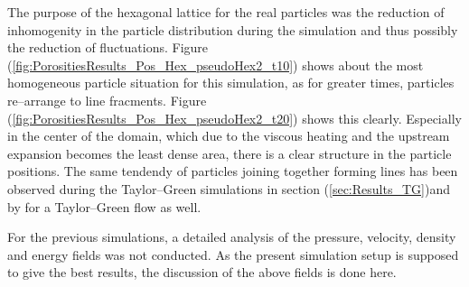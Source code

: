 \documentclass[11pt,a4paper,twoside]{report}
\begin{document}
The purpose of the hexagonal lattice for the real particles was the reduction of inhomogenity in the particle distribution during the simulation and thus possibly the reduction of fluctuations.  Figure (\ref{fig:PorositiesResults_Pos_Hex_pseudoHex2_t10}) shows about the most homogeneous particle situation for this simulation, as for greater times, particles re--arrange to line fracments. Figure (\ref{fig:PorositiesResults_Pos_Hex_pseudoHex2_t20}) shows this clearly. Especially in the center of the domain, which due to the viscous heating and the upstream expansion becomes the least dense area, there is a clear structure in the particle positions. The same tendendy of particles joining together forming lines has been observed during the Taylor--Green simulations in section (\ref{sec:Results_TG})and by \cite{Ellero2007} for a Taylor--Green flow as well. 

For the previous simulations, a detailed analysis of the pressure, velocity, density and energy fields was not conducted. As the present simulation setup is supposed to give the best results, the discussion of the above fields is done here.
\end{document}
